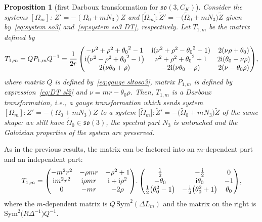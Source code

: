 \documentclass[10pt,a4paper]{amsart}
\numberwithin{equation}{section}
\newtheorem{Proposition}[Theorem]{Proposition}
 { \theoremstyle{definition}
\newtheorem{Definition}[Theorem]{Definition}
\newtheorem{Note}[Theorem]{Note}
\newtheorem{Example}[Theorem]{Example}
\newtheorem{Remark}[Theorem]{Remark} }
\def\Sym{\mathrm{Sym}}
\begin{document}
\begin{Proposition}[first Darboux transformation for $\mathfrak{so}(3, C_K)$]\label{secthdars031}
Consider the systems $[\Omega_m]$\emph{:} $Z' = - (\Omega_0 + mN_3 ) Z$ and $\big[\widetilde{\Omega}_m\big]\colon \widetilde{Z}' = - \big(\widetilde{\Omega}_0 + m N_3 \big) \widetilde{Z}$ given by~\eqref{eq:system so3} and~\eqref{eq:system so3 DT}, respectively.
 Let $T_{1,m}$ be the matrix defined by
\begin{align*}
 T_{1,m} = Q P_{1,m} Q^{-1} =\frac{1}{2 r} \begin{pmatrix}
-{\nu}^{2}+{\rho}^{2}+{\theta_0 }^{2}-1 & {\rm i} ({\nu}^{2}+{\rho}^{2}-{\theta_0}^{2}-1) & 2 (\nu \rho+\theta_0)
\\
{\rm i} \big({\nu}^{2}-{\rho}^{2}+{\theta_0 }^{2}-1\big) &{\nu}^{2}+{\rho}^{2}+{\theta_0 }^{2}+1 & 2 {\rm i} (\theta_0 -\nu \rho)
\\
2 ( \nu \theta_0 +\rho) &-2 {\rm i} (\nu \theta_0 -\rho) &2 ( \nu - \theta_0 \rho) \end{pmatrix}\!,
\end{align*}
where matrix $Q $ is defined by~\eqref{eq:gauge sltoso3},
matrix $P_{1,m}$ is defined by expression~\eqref{eq:DT sl2} and $\nu=mr-\theta_0 \rho$.
Then, $ T_{1,m}$ is a Darboux transformation, i.e., a
gauge transformation which sends system $ [\Omega_m]\colon Z' = - (\Omega_0 + mN_3 ) Z$ to a system $\big[\widetilde{\Omega}_m\big]\colon \widetilde{Z}' = - \big(\widetilde{\Omega}_0 + m {N}_3 \big) \widetilde{Z}$
of the same shape: we still have $\widetilde{\Omega}_0\in \mathfrak{so}(3)$, the spectral part $N_3$ is untouched and the Galoisian properties of the system are preserved.
\end{Proposition}


\begin{Remark}
As in the previous results, the matrix can be factored into an $m$-dependent part and an independent part:
\begin{gather*}
T_{1,m} = \begin{pmatrix} -{m}^{2}{r}^{2}&-\rho mr&-{\rho}^{2}+1
\\ {\rm i}{m}^{2}{r}^{2}&{\rm i}\rho mr&{\rm i}+{\rm i}{\rho}^{2}
\\ 0&-mr&-2 \rho
\end{pmatrix}\!. \begin{pmatrix} \frac{1}{2} &-\frac{\rm i}{2}&0\\ -\theta_{{0}} &{\rm i} \theta_{{0}}&-1\\
\frac{1}{2}\big(\theta_0^{2} -1\big)
&
-\frac{\rm i}{2} \big(\theta_0^{2}+1\big)
&\theta_{{0}}
\end{pmatrix}\!,
\end{gather*}
where the $m$-dependent matrix is
$Q\, \Sym^2(\Delta L_m)$ and the matrix on the right is $\Sym^2\!\big(R \Delta^{-1}\big) Q^{-1}$.
\end{Remark}
\end{document}
